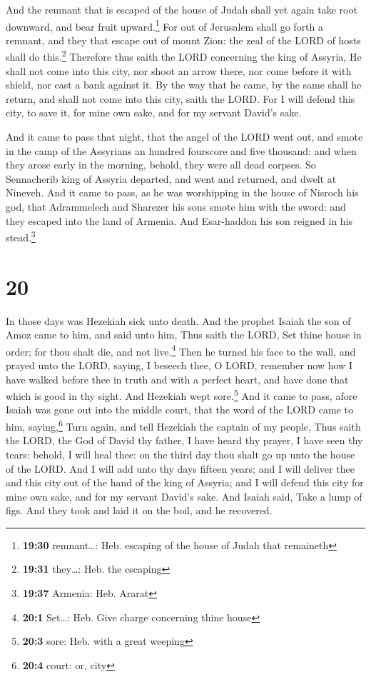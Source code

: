  And the remnant that is escaped of the house of Judah
shall yet again take root downward, and bear fruit upward.\footnote{\textbf{19:30}
  remnant\ldots: Heb. escaping of the house of Judah that remaineth}
 For out of Jerusalem shall go forth a remnant, and they
that escape out of mount Zion: the zeal of the LORD of hosts shall do
this.\footnote{\textbf{19:31} they\ldots: Heb. the escaping}
 Therefore thus saith the LORD concerning the king of
Assyria, He shall not come into this city, nor shoot an arrow there, nor
come before it with shield, nor cast a bank against it. 
By the way that he came, by the same shall he return, and shall not come
into this city, saith the LORD.  For I will defend this
city, to save it, for mine own sake, and for my servant David's sake.

 And it came to pass that night, that the angel of the
LORD went out, and smote in the camp of the Assyrians an hundred
fourscore and five thousand: and when they arose early in the morning,
behold, they were all dead corpses.  So Sennacherib king
of Assyria departed, and went and returned, and dwelt at Nineveh.
 And it came to pass, as he was worshipping in the house
of Nisroch his god, that Adrammelech and Sharezer his sons smote him
with the sword: and they escaped into the land of Armenia. And
Esar-haddon his son reigned in his stead.\footnote{\textbf{19:37}
  Armenia: Heb. Ararat}

\hypertarget{section-19}{%
\section{20}\label{section-19}}

 In those days was Hezekiah sick unto death. And the
prophet Isaiah the son of Amoz came to him, and said unto him, Thus
saith the LORD, Set thine house in order; for thou shalt die, and not
live.\footnote{\textbf{20:1} Set\ldots: Heb. Give charge concerning
  thine house}  Then he turned his face to the wall, and
prayed unto the LORD, saying,  I beseech thee, O LORD,
remember now how I have walked before thee in truth and with a perfect
heart, and have done that which is good in thy sight. And Hezekiah wept
sore.\footnote{\textbf{20:3} sore: Heb. with a great weeping}
 And it came to pass, afore Isaiah was gone out into the
middle court, that the word of the LORD came to him, saying,\footnote{\textbf{20:4}
  court: or, city}  Turn again, and tell Hezekiah the
captain of my people, Thus saith the LORD, the God of David thy father,
I have heard thy prayer, I have seen thy tears: behold, I will heal
thee: on the third day thou shalt go up unto the house of the LORD.
 And I will add unto thy days fifteen years; and I will
deliver thee and this city out of the hand of the king of Assyria; and I
will defend this city for mine own sake, and for my servant David's
sake.  And Isaiah said, Take a lump of figs. And they took
and laid it on the boil, and he recovered.

